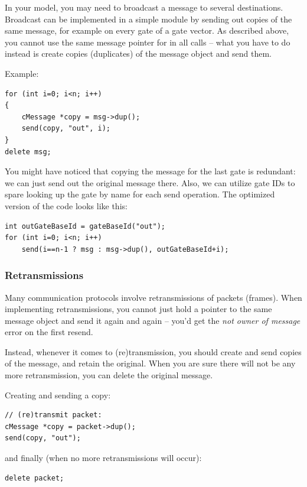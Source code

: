 In your model, you may need to broadcast a message to several destinations.
Broadcast can be implemented in a simple module by sending out copies
of the same message, for example on every gate of a gate vector.
As described above, you cannot use the same message pointer for
in all  calls -- what you have to do instead is
create copies (duplicates) of the message object and send them.

Example:

\begin{verbatim}
for (int i=0; i<n; i++)
{
    cMessage *copy = msg->dup();
    send(copy, "out", i);
}
delete msg;
\end{verbatim}

You might have noticed that copying the message for the last gate is
redundant: we can just send out the original message there.
Also, we can utilize gate IDs to spare looking up the gate by name
for each send operation. The optimized version of the code looks
like this:

\begin{verbatim}
int outGateBaseId = gateBaseId("out");
for (int i=0; i<n; i++)
    send(i==n-1 ? msg : msg->dup(), outGateBaseId+i);
\end{verbatim}


\subsubsection{Retransmissions}

Many communication protocols involve retransmissions of packets (frames).
When implementing retransmissions, you cannot just hold a pointer
to the same message object and send it again and again -- you'd get
the \textit{not owner of message} error on the first resend.

Instead, whenever it comes to (re)transmission, you should create and
send copies of the message, and retain the original.
When you are sure there will not be any more retransmission,
you can delete the original message.

Creating and sending a copy:

\begin{verbatim}
// (re)transmit packet:
cMessage *copy = packet->dup();
send(copy, "out");
\end{verbatim}

and finally (when no more retransmissions will occur):

\begin{verbatim}
delete packet;
\end{verbatim}


